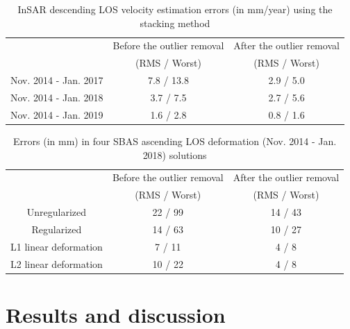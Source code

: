 \begin{table}
	\caption{InSAR descending LOS velocity estimation errors (in mm/year) using the stacking method}
	\begin{tabular}{|c|c|c|}
		\hline 
		& Before the outlier removal & After the outlier removal \\
		& (RMS / Worst) & (RMS / Worst) \\
		\hline 
		Nov. 2014 - Jan. 2017 & 7.8 / 13.8                            & 2.9 / 5.0                          \\\hline
		Nov. 2014 - Jan. 2018 & 3.7 / 7.5                             & 2.7 / 5.6                          \\\hline
		Nov. 2014 - Jan. 2019 & 1.6 / 2.8                             & 0.8 / 1.6  \\\hline     
	\end{tabular}
	\label{tab:gps-error-85}
\end{table}

\begin{table}
	\caption{Errors (in mm) in four SBAS ascending LOS deformation (Nov. 2014 - Jan. 2018) solutions}
	\centering
	\begin{tabular}{|c|c|c|}
		\hline 
		& Before the outlier removal & After the outlier removal \\
		& (RMS / Worst) & (RMS / Worst) \\
		\hline
		Unregularized &  22 / 99     &  14 / 43         \\\hline
		Regularized   &    14 / 63   &   10  / 27       \\\hline
		L1 linear deformation          &   7 / 11      & 4 / 8      \\\hline
		L2 linear deformation          &   10 / 22        & 4 / 8      \\\hline
	\end{tabular}
	\label{tab:compare-errors}
\end{table}



\section{Results and discussion}
